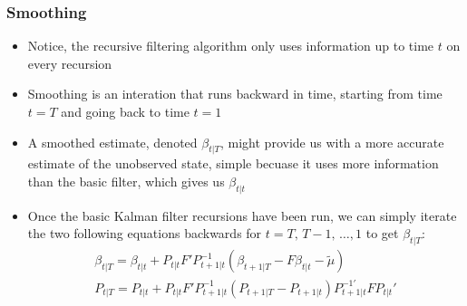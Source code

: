 \documentclass[10pt]{article}
\begin{document}
\subsubsection{Smoothing}
\begin{itemize}
    \item Notice, the recursive filtering algorithm only uses information up to time $t $ on every recursion 
    \item Smoothing is an interation that runs backward in time, starting from time $t = T $ and going back to time $t = 1 $
    \item A smoothed estimate, denoted $\beta_{t|T} $, might provide us with a more accurate estimate of the unobserved state, simple becuase it uses more information than the basic filter, which gives us $\beta_{t|t} $
    \item Once the basic Kalman filter recursions have been run, we can simply iterate the two following equations backwards for $t = T,\, T - 1, \, \dots, 1 $ to get $\beta_{t|T} $:
    \begin{gather*}
        \beta_{t|T} = \beta_{t|t} + P_{t|t }F'P_{t + 1|t}^{-1}(\beta_{t + 1|T} - F\beta_{t|t}- \tilde{\mu})\\
        P_{t|T} = P_{t|t} + P_{t|t}F'P_{t+1|t}^{-1}(P_{t+1|T} - P_{t + 1|t})P_{t + 1|t}^{-1\prime}FP_{t|t}'
    \end{gather*}
\end{itemize}
\newpage 
\end{document}
